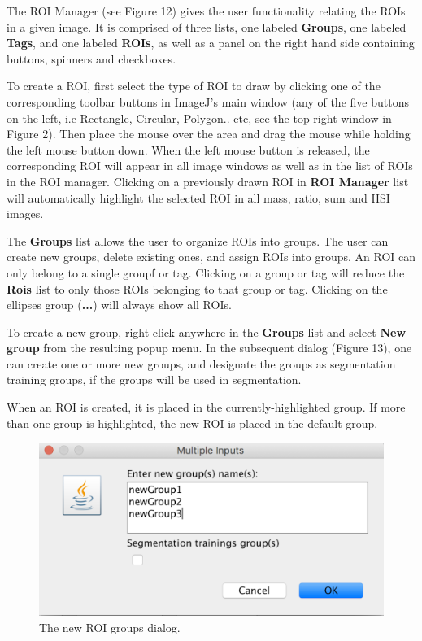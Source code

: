 \documentclass{article}
\begin{document}
	The ROI Manager (see Figure 12) gives the user functionality relating the ROIs
	in a given image. It is comprised of three lists, one labeled \textbf{Groups}, one labeled \textbf{Tags}, and
	one labeled \textbf{ROIs}, as well as a panel on the right hand side containing 
	buttons, spinners and checkboxes. 

   To create a ROI, first select the type of ROI to draw by clicking
   one of the corresponding toolbar buttons in ImageJ's main window (any of the five buttons on the left,
   i.e Rectangle, Circular, Polygon.. etc, see the top right window in Figure 2).
   Then place the mouse over the area and drag the mouse while holding the left mouse button down. When the left
   mouse button is released, the corresponding ROI will appear in all image windows
   as well as in the list of ROIs in the ROI manager.
   Clicking on a previously drawn ROI in \textbf{ROI Manager} list will automatically highlight the selected
   ROI in all mass, ratio, sum and HSI images.
   

	
	The \textbf{Groups} list allows the user to organize ROIs into groups.
   The user can create new groups, delete existing ones, and assign ROIs into groups.
   An ROI can only belong to a single groupf or tag. Clicking on a group or tag will reduce the \textbf{Rois} 
   list to only those ROIs belonging to that group or tag. Clicking on the ellipses group
   (\textbf{...}) will always show all ROIs.  
   
   To create a new group, right click anywhere in the \textbf{Groups}  list and select \textbf{New group}  
   from the resulting popup menu.  In the subsequent dialog (Figure 13), one can create one or more 
   new groups, and designate the groups as segmentation training groups, if the groups will be used in segmentation.
   
     When an ROI is created, it is placed in the currently-highlighted group.  If more 
   than one group is highlighted, the new ROI is placed in the default group.
	
	\begin{figure}[ht]
	\centering
	\includegraphics[scale=0.70]{snapshotNewGroup.png}
	\caption{ The new ROI groups dialog.}
	\end{figure}
   
\end{document}
